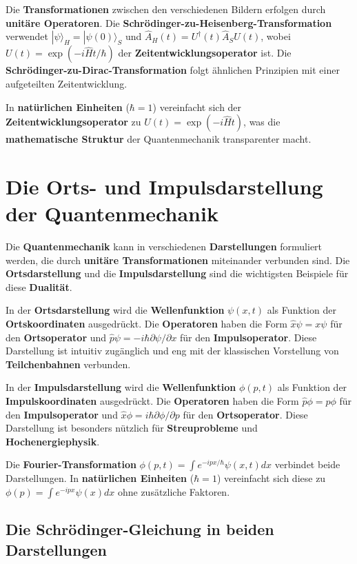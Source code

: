 \documentclass[12pt,a4paper]{report}
\begin{document}
	Die \textbf{Transformationen} zwischen den verschiedenen Bildern erfolgen durch \textbf{unitäre Operatoren}. Die \textbf{Schrödinger-zu-Heisenberg-Transformation} verwendet $|\psi\rangle_H = |\psi(0)\rangle_S$ und $\hat{A}_H(t) = U^\dagger(t)\hat{A}_S U(t)$, wobei $U(t) = \exp(-i\hat{H}t/\hbar)$ der \textbf{Zeitentwicklungsoperator} ist. Die \textbf{Schrödinger-zu-Dirac-Transformation} folgt ähnlichen Prinzipien mit einer aufgeteilten Zeitentwicklung.
	
	In \textbf{natürlichen Einheiten} ($\hbar = 1$) vereinfacht sich der \textbf{Zeitentwicklungsoperator} zu $U(t) = \exp(-i\hat{H}t)$, was die \textbf{mathematische Struktur} der Quantenmechanik transparenter macht.
	
	\section{Die Orts- und Impulsdarstellung der Quantenmechanik}
	
	Die \textbf{Quantenmechanik} kann in verschiedenen \textbf{Darstellungen} formuliert werden, die durch \textbf{unitäre Transformationen} miteinander verbunden sind. Die \textbf{Ortsdarstellung} und die \textbf{Impulsdarstellung} sind die wichtigsten Beispiele für diese \textbf{Dualität}.
	
	In der \textbf{Ortsdarstellung} wird die \textbf{Wellenfunktion} $\psi(x,t)$ als Funktion der \textbf{Ortskoordinaten} ausgedrückt. Die \textbf{Operatoren} haben die Form $\hat{x}\psi = x\psi$ für den \textbf{Ortsoperator} und $\hat{p}\psi = -i\hbar\partial\psi/\partial x$ für den \textbf{Impulsoperator}. Diese Darstellung ist intuitiv zugänglich und eng mit der klassischen Vorstellung von \textbf{Teilchenbahnen} verbunden.
	
	In der \textbf{Impulsdarstellung} wird die \textbf{Wellenfunktion} $\phi(p,t)$ als Funktion der \textbf{Impulskoordinaten} ausgedrückt. Die \textbf{Operatoren} haben die Form $\hat{p}\phi = p\phi$ für den \textbf{Impulsoperator} und $\hat{x}\phi = i\hbar\partial\phi/\partial p$ für den \textbf{Ortsoperator}. Diese Darstellung ist besonders nützlich für \textbf{Streuprobleme} und \textbf{Hochenergiephysik}.
	
	Die \textbf{Fourier-Transformation} $\phi(p,t) = \int e^{-ipx/\hbar}\psi(x,t)dx$ verbindet beide Darstellungen. In \textbf{natürlichen Einheiten} ($\hbar = 1$) vereinfacht sich diese zu $\phi(p) = \int e^{-ipx}\psi(x)dx$ ohne zusätzliche Faktoren.
	
	\subsection{Die Schrödinger-Gleichung in beiden Darstellungen}
	
\end{document}
